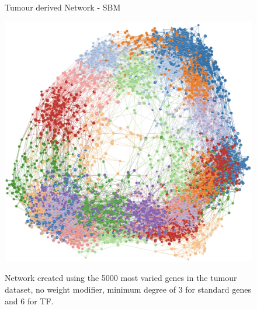 
\newpage
{}
\begin{figure}[p]
      \thispagestyle{empty} %
      \centering
      \captionsetup{justification=centering, labelfont=bf}
      \parbox{\textwidth}{\centering \Huge Tumour derived Network - SBM       \vspace{0.5cm} } %
      \includegraphics[width=0.9\paperwidth,keepaspectratio]{Sections/Network_pages/images/sbm_standard_5K_6TF_lowRes.jpg} 
      \parbox{0.8\textwidth}{Network created using the 5000 most varied genes in the tumour dataset, no weight modifier, minimum degree of 3 for standard genes and 6 for TF.}
\end{figure}
\restoregeometry
